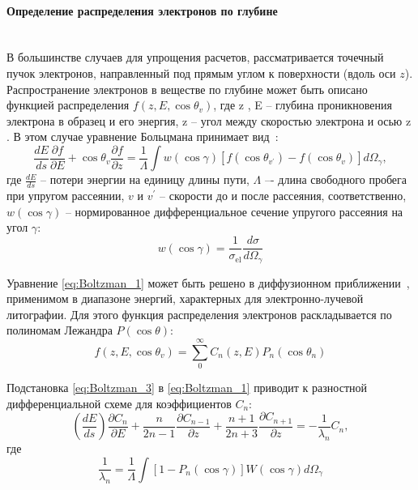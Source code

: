 \paragraph{Определение распределения электронов по глубине} \mbox{} \\
\indent В большинстве случаев для упрощения расчетов, рассматривается точечный пучок электронов, направленный под прямым углом к поверхности (вдоль оси $z$). Распространение электронов в веществе по глубине может быть описано функцией распределения $f(z, E, \cos \theta_v)$, где z , E – глубина проникновения электрона в образец и его энергия, z – угол между скоростью электрона и осью z . В этом случае уравнение Больцмана принимает вид~\cite{ME_rev_60}:
\begin{equation} \label{eq:Boltzman_1}
	\frac{d E}{d s} \frac{\partial f}{\partial E}+\cos \theta_v \frac{\partial f}{\partial z}=\frac{1}{\Lambda} \int w(\cos \gamma)\left[f\left(\cos \theta_{v^{\prime}}\right)-f\left(\cos \theta_v\right)\right] d \Omega_\gamma,
\end{equation}
где $\frac{dE}{ds}$ -- потери энергии на единицу длины пути, $\Lambda$ –- длина свободного пробега при упругом рассеянии, $v$ и $v^{\prime}$ -- скорости до и после рассеяния, соответственно, $w(\cos \gamma)$ -- нормированное дифференциальное сечение упругого рассеяния на угол $\gamma$:
\begin{equation} \label{eq:Boltzman_2}
	w(\cos \gamma)=\frac{1}{\sigma_{\mathrm{el}}} \frac{d \sigma}{d \Omega_\gamma}
\end{equation}

Уравнение \ref{eq:Boltzman_1} может быть решено в диффузионном приближении~\cite{ME_rev_61}, применимом в диапазоне энергий, характерных для электронно-лучевой литографии. Для этого функция распределения электронов раскладывается по полиномам Лежандра $P(\cos \theta)$:
\begin{equation} \label{eq:Boltzman_3}
	f\left(z, E, \cos \theta_v\right)=\sum_0^{\infty} C_n(z, E) P_n\left(\cos \theta_n\right)
\end{equation}

Подстановка \ref{eq:Boltzman_3} в \ref{eq:Boltzman_1} приводит к разностной дифференциальной схеме для коэффициентов $C_n$:
\begin{equation} \label{eq:Boltzman_4}
	\left(\frac{d E}{d s}\right) \frac{\partial C_n}{\partial E}+\frac{n}{2 n-1} \frac{\partial C_{n-1}}{\partial z}+\frac{n+1}{2 n+3} \frac{\partial C_{n+1}}{\partial z}=-\frac{1}{\lambda_n} C_n,
\end{equation}
где
\begin{equation} \label{eq:Boltzman_5}
	\frac{1}{\lambda_n}=\frac{1}{\Lambda} \int\left[1-P_n(\cos \gamma)\right] W(\cos \gamma) d \Omega_\gamma
\end{equation}

